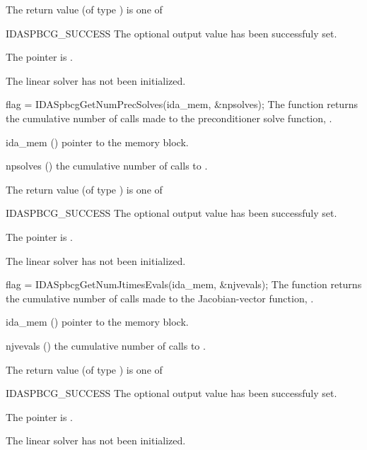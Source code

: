 {
  The return value  (of type ) is one of
  \begin{args}
  \item[IDASPBCG\_SUCCESS] 
    The optional output value has been successfuly set.
  \item[\Id{IDASPBCG\_MEM\_NULL}]
    The  pointer is .
  \item[\Id{IDASPBCG\_LMEM\_NULL}]
    The {\idaspbcg} linear solver has not been initialized.
  \end{args}
}
{}
{
  flag = IDASpbcgGetNumPrecSolves(ida\_mem, \&npsolves);
}
{
  The function  returns the
  cumulative number of calls made to the preconditioner 
  solve function, .
}
{
  \begin{args}[npsolves]
  \item[ida\_mem] ()
    pointer to the {\ida} memory block.
  \item[npsolves] ()
    the cumulative number of calls to .
  \end{args}
}
{
  The return value  (of type ) is one of
  \begin{args}
  \item[IDASPBCG\_SUCCESS] 
    The optional output value has been successfuly set.
  \item[\Id{IDASPBCG\_MEM\_NULL}]
    The  pointer is .
  \item[\Id{IDASPBCG\_LMEM\_NULL}]
    The {\idaspbcg} linear solver has not been initialized.
  \end{args}
}
{}
{
  flag = IDASpbcgGetNumJtimesEvals(ida\_mem, \&njvevals);
}
{
  The function  returns the
  cumulative number of calls made to the Jacobian-vector function,
  .
}
{
  \begin{args}[njvevals]
  \item[ida\_mem] ()
    pointer to the {\ida} memory block.
  \item[njvevals] ()
    the cumulative number of calls to .
  \end{args}
}
{
  The return value  (of type ) is one of
  \begin{args}
  \item[IDASPBCG\_SUCCESS] 
    The optional output value has been successfuly set.
  \item[\Id{IDASPBCG\_MEM\_NULL}]
    The  pointer is .
  \item[\Id{IDASPBCG\_LMEM\_NULL}]
    The {\idaspbcg} linear solver has not been initialized.
  \end{args}
}
